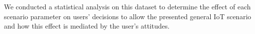 %
%
%
%

We conducted a statistical analysis on this dataset to determine the effect of each scenario parameter on users' decisions to allow the presented general IoT scenario and how this effect is mediated by the user's attitudes.

